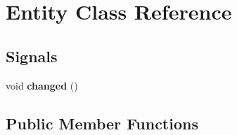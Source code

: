 \hypertarget{class_entity}{}\section{Entity Class Reference}
\label{class_entity}
\subsection*{Signals}
\begin{DoxyCompactItemize}
\item 
\mbox{\label{class_entity_a92c931d37a70193cfd22142bd1939be4}} 
void {\bfseries changed} ()
\end{DoxyCompactItemize}
\subsection*{Public Member Functions}
